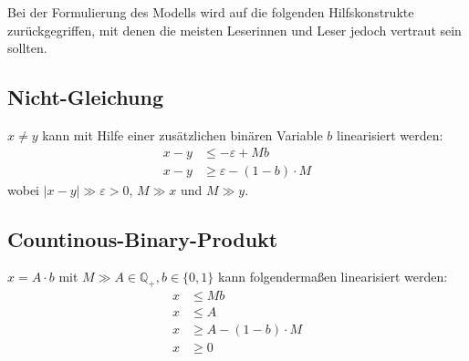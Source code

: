 \documentclass[a4paper,11pt]{amsart}
\begin{document}
\noindent Bei der Formulierung des Modells wird auf die folgenden Hilfskonstrukte zurückgegriffen, mit denen die meisten Leserinnen und Leser jedoch vertraut sein sollten.

\subsection*{Nicht-Gleichung} $x \ne y$ kann mit Hilfe einer zusätzlichen binären Variable $b$ linearisiert werden:
\begin{align*}
x - y &\le - \varepsilon + M b\\
x - y &\ge \varepsilon - (1-b)\cdot M
\end{align*}
wobei $\left|x-y\right| \gg \varepsilon > 0$, $M \gg x$ und $M \gg y$.
\bigskip

\subsection*{Countinous-Binary-Produkt}$x = A \cdot b$ mit $M \gg A \in \mathbb{Q_+}, b \in \{0, 1\}$ kann folgendermaßen linearisiert werden:
\begin{align*}
x &\le M b\\
x &\le A\\
x &\ge A - (1-b) \cdot M\\
x &\ge 0\\
\end{align*}


\bigskip
\bigskip
\bigskip
\end{document}
